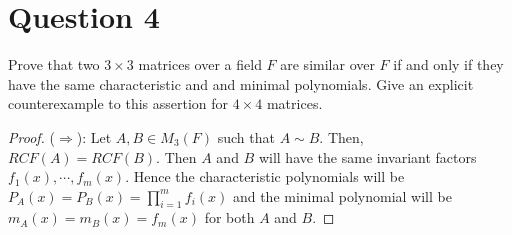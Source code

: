\section{Question 4}

\begin{question}
    Prove that two $3 \times 3$ matrices over a field $F$ are similar over $F$ if and only if they have the same characteristic and and minimal polynomials. Give an explicit counterexample to this assertion for $4 \times 4$ matrices.
\end{question}

\begin{answer}
    \begin{proof}
        ($\Rightarrow$): Let $A,B \in M_3(F)$ such that $A \sim B$. Then, $RCF(A) = RCF(B)$. Then $A$ and $B$ will have the same invariant factors $f_1(x),\cdots,f_m(x)$. Hence the characteristic polynomials will be $P_A(x) = P_B(x) = \prod_{i = 1}^{m}f_i(x)$ and the minimal polynomial will be $m_A(x) = m_B(x) = f_m(x)$ for both $A$ and $B$.
        

\end{proof}
\end{answer}
